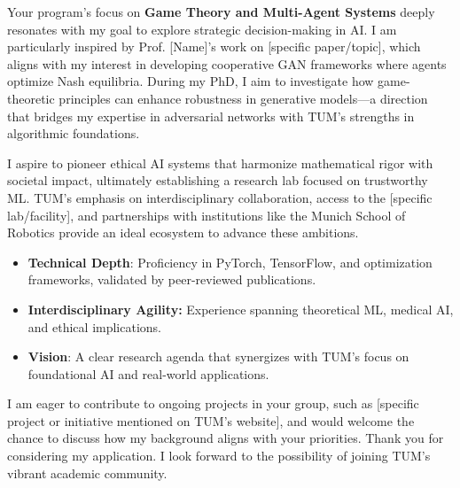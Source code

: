 \documentclass[11pt,a4paper, final]{moderncv}
\newcommand{\spacesubsection}{\vspace{0.2cm}}
\begin{document}
Your program's focus on \textbf{Game Theory and Multi-Agent Systems} 
deeply resonates with my goal to explore strategic decision-making in AI. 
I am particularly inspired by Prof. [Name]'s work on [specific paper/topic], 
which aligns with my interest in developing cooperative GAN frameworks where agents optimize Nash equilibria. 
During my PhD, I aim to investigate 
how game-theoretic principles can enhance robustness in generative models—a direction 
that bridges my expertise in adversarial networks with TUM's strengths in algorithmic foundations.

I aspire to pioneer ethical AI systems that harmonize mathematical rigor with societal impact, 
ultimately establishing a research lab focused on trustworthy ML. 
TUM's emphasis on interdisciplinary collaboration, access to the [specific lab/facility], 
and partnerships with institutions like the Munich School of Robotics provide an ideal ecosystem to advance these ambitions.

\spacesubsection
\begin{itemize}
	\item \textbf{Technical Depth}: Proficiency in PyTorch, TensorFlow, and optimization frameworks, validated by peer-reviewed publications.
	\item \textbf{Interdisciplinary Agility:} Experience spanning theoretical ML, medical AI, and ethical implications.
	\item \textbf{Vision}: A clear research agenda that synergizes with TUM's focus on foundational AI and real-world applications.
\end{itemize}

I am eager to contribute to ongoing projects in your group, 
such as [specific project or initiative mentioned on TUM's website], 
and would welcome the chance to discuss how my background aligns with your priorities. 
Thank you for considering my application. 
I look forward to the possibility of joining TUM's vibrant academic community.

\makeletterclosing
\end{document}
